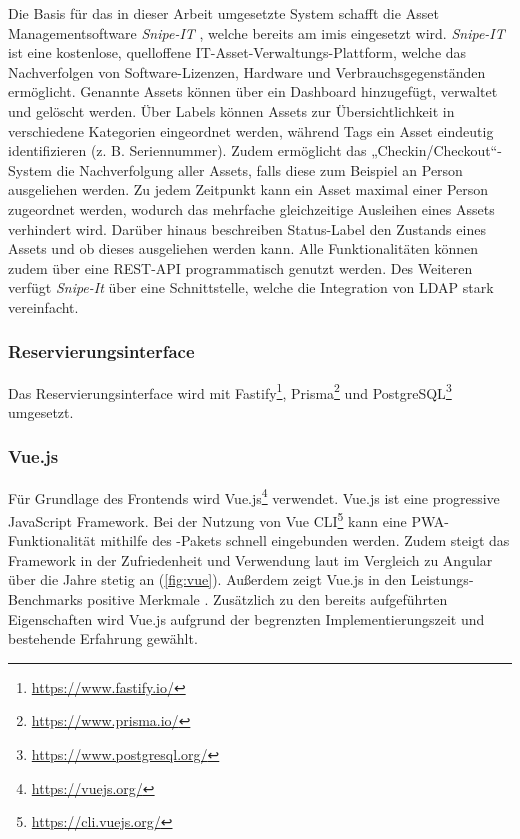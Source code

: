 Die Basis für das in dieser Arbeit umgesetzte System schafft die Asset Managementsoftware
\textit{Snipe-IT} \cite{noauthor_home_nodate}, welche bereits am \ac{imis} eingesetzt wird.
\textit{Snipe-IT} ist eine kostenlose, quelloffene IT-Asset-Verwaltungs-Plattform, welche das
Nachverfolgen von Software-Lizenzen, Hardware und Verbrauchsgegenständen ermöglicht. Genannte Assets
können über ein Dashboard hinzugefügt, verwaltet und gelöscht werden. Über Labels können Assets zur
Übersichtlichkeit in verschiedene Kategorien eingeordnet werden, während Tags ein Asset eindeutig
identifizieren (z. B. Seriennummer). Zudem ermöglicht das „Checkin/Checkout“-System die
Nachverfolgung aller Assets, falls diese zum Beispiel an Person ausgeliehen werden. Zu jedem
Zeitpunkt kann ein Asset maximal einer Person zugeordnet werden, wodurch das mehrfache gleichzeitige
Ausleihen eines Assets verhindert wird. Darüber hinaus beschreiben Status-Label den Zustands eines
Assets und ob dieses ausgeliehen werden kann. Alle Funktionalitäten können zudem über eine REST-API
programmatisch genutzt werden. Des Weiteren verfügt \textit{Snipe-It} über eine Schnittstelle,
welche die Integration von LDAP stark vereinfacht.

\subsubsection{Reservierungsinterface}
Das Reservierungsinterface wird mit Fastify\footnote{\url{https://www.fastify.io/}},
Prisma\footnote{\url{https://www.prisma.io/}} und
PostgreSQL\footnote{\url{https://www.postgresql.org/}} umgesetzt. 

\subsubsection{Vue.js}
Für Grundlage des Frontends wird Vue.js\footnote{\url{https://vuejs.org/}} verwendet. Vue.js ist
eine progressive JavaScript Framework. Bei der Nutzung von Vue
CLI\footnote{\url{https://cli.vuejs.org/}} kann eine PWA-Funktionalität mithilfe des
-Pakets schnell eingebunden werden. Zudem steigt das Framework in
der Zufriedenheit und Verwendung laut  im Vergleich zu Angular über die Jahre
stetig an (\ref{fig:vue}). Außerdem zeigt Vue.js in den Leistungs-Benchmarks positive Merkmale
. Zusätzlich zu den bereits aufgeführten Eigenschaften wird Vue.js aufgrund der
begrenzten Implementierungszeit und bestehende Erfahrung gewählt.

